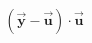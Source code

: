 \documentclass[preview]{standalone}
\begin{document}
\begin{align*}
( \mathbf{\vec{y}} - \mathbf{\vec{u}} ) \cdot \mathbf{\vec{u}}
\end{align*}
\end{document}
